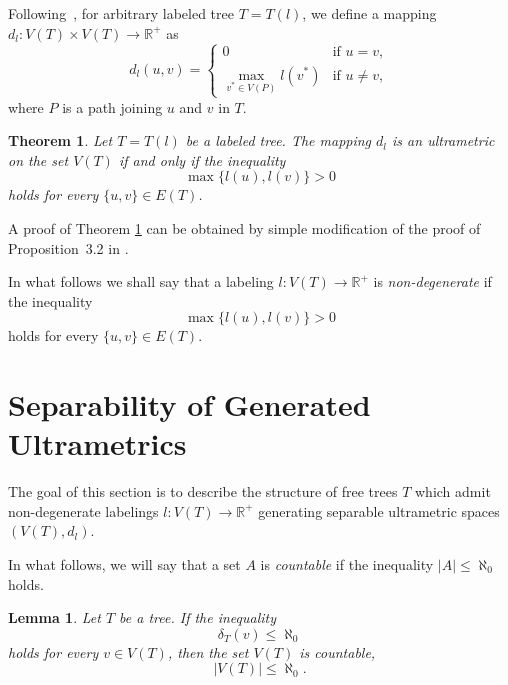 \documentclass[pdflatex,sn-mathphys-num]{sn-jnl}%
\newtheorem{theorem}{Theorem}%
\newtheorem{lemma}{Lemma}%
\theoremstyle{thmstyletwo}%
\begin{document}
Following~\cite{Dov2020TaAoG}, for arbitrary labeled tree \(T = T(l)\), we define a mapping \(d_l \colon V(T) \times V(T) \to \mathbb R^{+}\) as
\begin{equation}\label{e11.3}
d_l(u, v) = \begin{cases}
0 & \text{if } u = v,\\
\max\limits_{v^{*} \in V(P)} l(v^{*}) & \text{if } u \neq v,
\end{cases}
\end{equation}
where \(P\) is a path joining \(u\) and \(v\) in \(T\).
 


\begin{theorem}\label{t11.9}
Let \(T = T(l)\) be a labeled tree. The mapping \(d_l\) is an ultrametric  on the set $V(T)$ if and only if the inequality
\begin{equation}\label{t11.9:e1}
\max\{l(u), l(v)\} > 0
\end{equation}
holds for every \(\{u, v\} \in E(T)\).
\end{theorem}

A proof of Theorem \ref{t11.9} can be obtained by simple modification of the proof of Proposition~3.2 in \cite{Dov2020TaAoG}.


In what follows we shall say that a labeling $l \colon V(T) \to \mathbb{R}^+$ is {\it non-degenerate} if the inequality
\begin{equation*}
\max \{ l(u), l(v) \} > 0
\end{equation*}
holds for every $\{u, v\} \in E(T)$.











\section{Separability of Generated Ultrametrics}\label{sec3}

 The goal of this section is to describe the structure of free trees $T$ which admit non-degenerate labelings 
$l \colon V(T) \to \mathbb{R}^+$ generating separable ultrametric spaces $(V(T), d_l)$.


In what follows, we will say that a set $A$ is {\it countable} if the inequality $|A| \leq \aleph_0$ holds.


\begin{lemma}\label{wseet} Let $T$ be a tree. If the inequality
\begin{equation}
\label{umiiw}
\delta_T(v) \leq \aleph_0 
\end{equation}
holds for every $v \in V(T)$, then the set $V(T)$ is countable, 
\begin{equation}
\label{efikki}
|V(T)| \leq \aleph_0. 
\end{equation}
\end{lemma}
\end{document}
